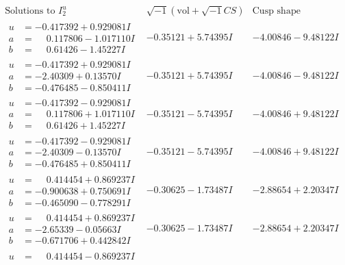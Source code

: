 \documentclass[1p]{elsarticle_modified}
\theoremstyle{definition}
\newcommand{\I}{\sqrt{-1}}
\begin{document}
$$\begin{array}{c|c|c}  
\text{Solutions to }I^u_{2}& \I (\text{vol} + \sqrt{-1}CS) & \text{Cusp shape}\\
 \hline 
\begin{aligned}
u &= -0.417392 + 0.929081 I \\
a &= \phantom{-}0.117806 - 1.017110 I \\
b &= \phantom{-}0.61426 - 1.45227 I\end{aligned}
 & -0.35121 + 5.74395 I & -4.00846 - 9.48122 I \\ \hline\begin{aligned}
u &= -0.417392 + 0.929081 I \\
a &= -2.40309 + 0.13570 I \\
b &= -0.476485 - 0.850411 I\end{aligned}
 & -0.35121 + 5.74395 I & -4.00846 - 9.48122 I \\ \hline\begin{aligned}
u &= -0.417392 - 0.929081 I \\
a &= \phantom{-}0.117806 + 1.017110 I \\
b &= \phantom{-}0.61426 + 1.45227 I\end{aligned}
 & -0.35121 - 5.74395 I & -4.00846 + 9.48122 I \\ \hline\begin{aligned}
u &= -0.417392 - 0.929081 I \\
a &= -2.40309 - 0.13570 I \\
b &= -0.476485 + 0.850411 I\end{aligned}
 & -0.35121 - 5.74395 I & -4.00846 + 9.48122 I \\ \hline\begin{aligned}
u &= \phantom{-}0.414454 + 0.869237 I \\
a &= -0.900638 + 0.750691 I \\
b &= -0.465090 - 0.778291 I\end{aligned}
 & -0.30625 - 1.73487 I & -2.88654 + 2.20347 I \\ \hline\begin{aligned}
u &= \phantom{-}0.414454 + 0.869237 I \\
a &= -2.65339 - 0.05663 I \\
b &= -0.671706 + 0.442842 I\end{aligned}
 & -0.30625 - 1.73487 I & -2.88654 + 2.20347 I \\ \hline\begin{aligned}
u &= \phantom{-}0.414454 - 0.869237 I \\

\end{aligned}
\end{array}$$
\end{document}
